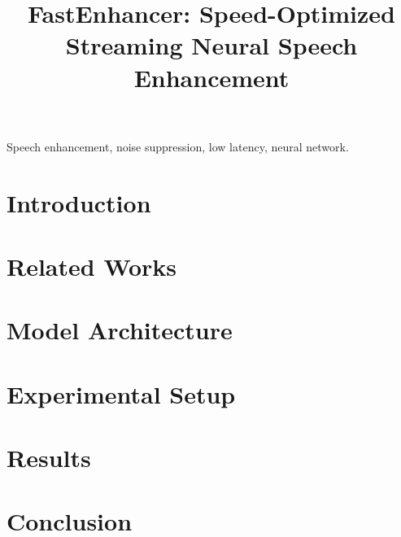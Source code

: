 \documentclass{article}
\title{FastEnhancer: Speed-Optimized Streaming Neural Speech Enhancement}
\begin{document}
\ninept
%
\maketitle
%
\begin{abstract}

\end{abstract}
%
\begin{keywords}
Speech enhancement, noise suppression, low latency, neural network.
\end{keywords}
%
\section{Introduction}


\section{Related Works}


\section{Model Architecture}
\label{sec:model}


\section{Experimental Setup}
\label{sec:setup}






\section{Results}
\label{sec:results}


\section{Conclusion}


\clearpage

\let\OLDthebibliography\thebibliography
\renewcommand\thebibliography[1]{
  \OLDthebibliography{#1}
  \setlength{\parskip}{0pt}
  \setlength{\itemsep}{0pt plus 0.3ex}
}


\end{document}
